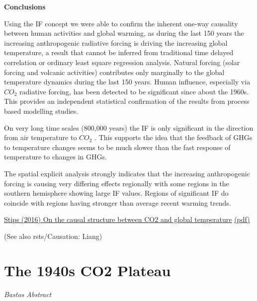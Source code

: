 \documentclass[
]{book}
\begin{document}
\textbf{Conclusions}

Using the IF concept we were able to confirm the inherent one-way causality between
human activities and global warming, as during the last 150 years the increasing
anthropogenic radiative forcing is driving the increasing global temperature,
a result that cannot be inferred from traditional time delayed correlation or
ordinary least square regression analysis.
Natural forcing (solar forcing and volcanic activities) contributes only marginally to
the global temperature dynamics during the last 150 years.
Human influence, especially via \(CO_2\) radiative forcing,
has been detected to be significant since about the 1960s.
This provides an independent statistical confirmation of
the results from process based modelling studies.

On very long time scales (800,000 years) the IF is only significant in
the direction from air temperature to \(CO_2\) .
This supports the idea that the feedback of GHGs to temperature changes
seems to be much slower than the fast response of
temperature to changes in GHGs.

The spatial explicit analysis strongly indicates that the increasing anthropogenic
forcing is causing very differing effects regionally with some regions in
the southern hemisphere showing large IF values.
Regions of significant IF do coincide with regions having stronger than average
recent warming trends.

\href{https://www.nature.com/articles/srep21691}{Stips (2016) On the causal structure between CO2 and global temperature}
\href{pdf/Stips_2016_Causal_structure_CO2_temperature.pdf}{(pdf)}

(See also rsts/Causation: Liang)

\hypertarget{the-1940s-co2-plateau}{%
\section{The 1940s CO2 Plateau}\label{the-1940s-co2-plateau}}

\emph{Bastos Abstract}
\end{document}
